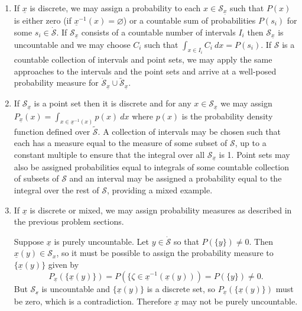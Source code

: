 \documentclass{article}
\begin{document}
\begin{enumerate}[label=(\alph*)]
  \item{If $\underline{x}$ is discrete, we may assign a probability to each
        $x \in \mathcal{S}_{\underline{x}}$ such that $P(x)$ is either zero
        (if $\underline{x}^{-1}(x) = \varnothing$) or a countable sum of
        probabilities $P(s_i)$ for some $s_i \in \dot{\mathcal{S}}$. If
        $\mathcal{S}_{\underline{x}}$ consists of a countable number of 
        intervals $I_i$ then $\mathcal{S}_{\underline{x}}$ is uncountable
        and we may choose $C_i$ such that 
        $\int_{x \in I_i} C_i ~dx = P(s_i)$. If $\mathcal{S}$ is a countable
        collection of intervals and point sets, we may apply the same
        approaches to the intervals and the point sets and arrive at a
        well-posed probability measure for 
        $\dot{\mathcal{S}}_{\underline{x}} \cup 
         \tilde{\mathcal{S}}_{\underline{x}}$.
       }
  \item{If $\mathcal{S}_{\underline{x}}$ is a point set then it is discrete
        and for any $x \in \mathcal{S}_{\underline{x}}$ we may assign
        $P_{\underline{x}}(x) = \int_{x \in \underline{x}^{-1}(x)} p(x)~dx$
        where $p(x)$ is the probability density function defined over 
        $\tilde{\mathcal{S}}$. A collection of intervals may be chosen
        such that each has a measure equal to the measure of some subset
        of $\mathcal{S}$, up to a constant multiple to ensure that the
        integral over all $\mathcal{S}_{\underline{x}}$ is 1. Point sets 
        may 
        also be assigned probabilities equal to integrals of some countable
        collection of subsets of $\mathcal{S}$ 
        and an interval may be assigned a probability equal to the integral
        over the rest of $\mathcal{S}$, providing a mixed example.
       }
  \item{If $\underline{x}$ is discrete or mixed, we may assign probability 
        measures as described in the previous problem sections. 

        Suppose $\underline{x}$ is purely uncountable. Let 
        $y \in \dot{\mathcal{S}}$ so that $P(\{y\}) \neq 0$. Then 
        $\underline{x}(y) \in \mathcal{S}_x$, so it must be possible to
        assign the probability measure to $\{\underline{x}(y)\}$ given by
        $$
        P_{\underline{x}}(\{\underline{x}(y)\}) 
          = P(\{\zeta \in \underline{x}^{-1}(\underline{x}(y)))
          = P(\{y\}) \neq 0.
        $$
        But $\mathcal{S_{\underline{x}}}$ is uncountable and 
        $\{\underline{x}(y)\}$ is a discrete set, so 
        $P_{\underline{x}}(\{\underline{x}(y)\})$ must be zero, which is a
        contradiction. Therefore $\underline{x}$ may not be purely 
        uncountable.
        }
        
\end{enumerate}
\end{document}
